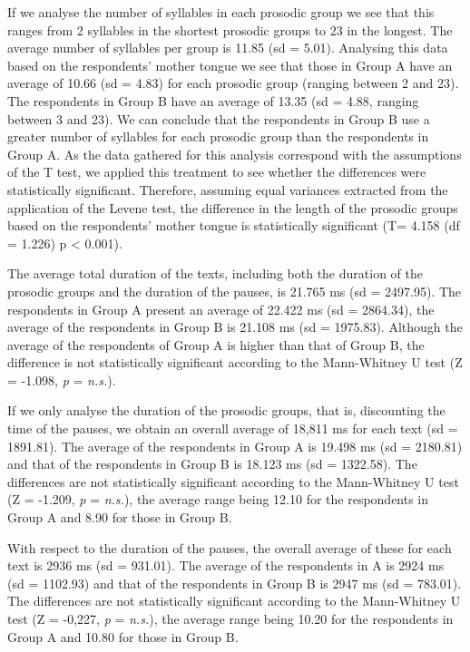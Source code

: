 \documentclass[output=paper]{langsci/langscibook}
\begin{document}
  If we analyse the number of syllables in each prosodic group we see that this ranges from 2 syllables in the shortest prosodic groups to 23 in the longest. The average number of syllables per group is 11.85 (sd = 5.01). Analysing this data based on the respondents’ mother tongue we see that those in Group A have an average of 10.66 (sd = 4.83) for each prosodic group (ranging between 2 and 23). The respondents in Group B have an average of 13.35 (sd = 4.88, ranging between 3 and 23). We can conclude that the respondents in Group B use a greater number of syllables for each prosodic group than the respondents in Group A. As the data gathered for this analysis correspond with the assumptions of the T test, we applied this treatment to see whether the differences were statistically significant. Therefore, assuming equal variances extracted from the application of the Levene test, the difference in the length of the prosodic groups based on the respondents’ mother tongue is statistically significant (T= 4.158 (df = 1.226) p < 0.001).

  The average total duration of the texts, including both the duration of the prosodic groups and the duration of the pauses, is 21.765 ms (sd = 2497.95). The respondents in Group A present an average of 22.422 ms (sd = 2864.34), the average of the respondents in Group B is 21.108 ms (sd = 1975.83). Although the average of the respondents of Group A is higher than that of Group B, the difference is not statistically significant according to the Mann-Whitney U test (Z = -1.098, \textit{p} = \textit{n.s.}).

  If we only analyse the duration of the prosodic groups, that is, discounting the time of the pauses, we obtain an overall average of 18,811 ms for each text (sd = 1891.81). The average of the respondents in Group A is 19.498 ms (sd = 2180.81) and that of the respondents in Group B is 18.123 ms (sd = 1322.58). The differences are not statistically significant according to the Mann-Whitney U test (Z = -1.209, \textit{p} = \textit{n.s.}), the average range being 12.10 for the respondents in Group A and 8.90 for those in Group B.

  With respect to the duration of the pauses, the overall average of these for each text is 2936 ms (sd = 931.01). The average of the respondents in A is 2924 ms (sd = 1102.93) and that of the respondents in Group B is 2947 ms (sd = 783.01). The differences are not statistically significant according to the Mann-Whitney U test (Z = -0,227, \textit{p} = \textit{n.s.}), the average range being 10.20 for the respondents in Group A and 10.80 for those in Group B.
\end{document}
